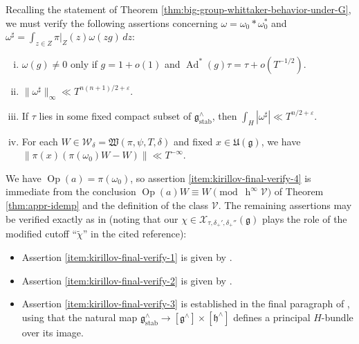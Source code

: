\documentclass[reqno]{amsart}
\DeclareMathOperator{\Ad}{Ad}
\DeclareMathOperator{\h}{h}
\def\eps{\varepsilon}
\DeclareMathOperator{\stab}{stab}
\DeclareMathOperator{\Opp}{Op}
\theoremstyle{plain} \newtheorem{theorem} {Theorem}
\theoremstyle{definition} \newtheorem{definition} [theorem] {Definition}
\theoremstyle{itplain} %
\numberwithin{equation}{section}
\numberwithin{theorem}{section}
\begin{document}
Recalling the statement of Theorem \ref{thm:big-group-whittaker-behavior-under-G}, we must verify the following assertions concerning $\omega = \omega_0 \ast \omega_0^*$ and $\omega ^\sharp = \int _{z \in Z} \pi|_Z (z) \omega(z g) \, d z$:
\begin{enumerate}[(i)]
\item \label{item:kirillov-final-verify-1} $\omega(g) \neq 0$ only if $g = 1 + o(1)$ and $\Ad^*(g) \tau = \tau + o(T^{-1/2})$.
\item \label{item:kirillov-final-verify-2} $\|\omega^\sharp\|_{\infty} \ll T^{n(n+1)/2+\eps}$.
\item \label{item:kirillov-final-verify-3} If $\tau$ lies in some fixed compact subset of $\mathfrak{g}^\wedge_{\stab}$, then $\int_H |\omega^\sharp| \ll T^{n/2 + \eps}$.
\item \label{item:kirillov-final-verify-4} For each $W \in \mathcal{W}_\delta = \mathfrak{W}(\pi,\psi,T,\delta)$ and fixed $x \in \mathfrak{U}(\mathfrak{g})$, we have $\|\pi(x) (\pi(\omega_0)W - W)\| \ll T^{-\infty}$.
\end{enumerate}
We have $\Opp(a) = \pi(\omega_0)$, so assertion \eqref{item:kirillov-final-verify-4} is immediate from the conclusion $\Opp(a) W \equiv W \pmod{\h^\infty \mathcal{V}}$ of Theorem \ref{thm:appr-idemp} and the definition of the class $\mathcal{V}$.  The remaining assertions may be verified exactly as in \cite[\S14.9]{2020arXiv201202187N} (noting that our $\chi \in \mathcal{X}_{\tau, \delta _+', \delta_+''}(\mathfrak{g})$ plays the role of the modified cutoff ``$\tilde{\chi}$'' in the cited reference):
\begin{itemize}
\item Assertion \eqref{item:kirillov-final-verify-1} is given by \cite[(14.13)]{2020arXiv201202187N}.
\item Assertion \eqref{item:kirillov-final-verify-2} is given by \cite[(14.14)]{2020arXiv201202187N}.
\item Assertion \eqref{item:kirillov-final-verify-3} is established in the final paragraph of \cite[\S14.9]{2020arXiv201202187N}, using that the natural map $\mathfrak{g}^\wedge_{\stab} \rightarrow [\mathfrak{g}^\wedge] \times [\mathfrak{h}^\wedge]$ defines a principal $H$-bundle over its image.
\end{itemize}
\end{document}
